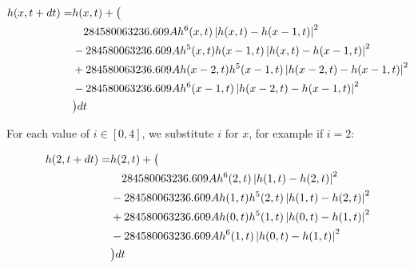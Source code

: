 \documentclass{article}
\begin{document}
\begin{equation}
    \begin{split}
        h(x, t+dt)=&
        h{\left(x,t \right)}+ \big{(}\\
        & \quad 284580063236.609 A h^{6}{\left(x,t \right)} \left|{h{\left(x,t \right)} - h{\left(x - 1,t \right)}}\right|^{2}\\
        & - 284580063236.609 A h^{5}{\left(x,t \right)} h{\left(x - 1,t \right)} \left|{h{\left(x,t \right)} - h{\left(x - 1,t \right)}}\right|^{2} \\
        & + 284580063236.609 A h{\left(x - 2,t \right)} h^{5}{\left(x - 1,t \right)} \left|{h{\left(x - 2,t \right)} - h{\left(x - 1,t \right)}}\right|^{2}  \\
        &- 284580063236.609 A h^{6}{\left(x - 1,t \right)} \left|{h{\left(x - 2,t \right)} - h{\left(x - 1,t \right)}}\right|^{2}\\
        &\big{)} dt
    \end{split}
\end{equation}




For each value of $i \in [0, 4]$, we substitute $i$ for $x$, for example if $i=2$:

\begin{equation}
    \begin{split}
        h(2, t+dt)=& h{\left(2,t \right)}+ \big{(}\\
        &\quad 284580063236.609 A h^{6}{\left(2,t \right)} \left|{h{\left(1,t \right)} - h{\left(2,t \right)}}\right|^{2}\\
        & - 284580063236.609 A h{\left(1,t \right)} h^{5}{\left(2,t \right)} \left|{h{\left(1,t \right)} - h{\left(2,t \right)}}\right|^{2} \\
        & +284580063236.609 A h{\left(0,t \right)} h^{5}{\left(1,t \right)} \left|{h{\left(0,t \right)} - h{\left(1,t \right)}}\right|^{2} \\
        &- 284580063236.609 A h^{6}{\left(1,t \right)} \left|{h{\left(0,t \right)} - h{\left(1,t \right)}}\right|^{2} \\
        &\big{)} dt
    \end{split}
\end{equation}
\end{document}
